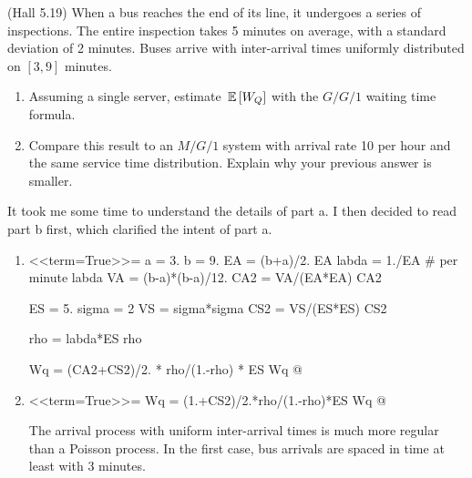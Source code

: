 \begin{question}
  (Hall 5.19) When a bus reaches the end of its line, it undergoes a
  series of inspections. The entire inspection takes 5 minutes on
  average, with a standard deviation of 2 minutes. Buses arrive with
  inter-arrival times uniformly distributed on $[3,9]$ minutes.
  \begin{enumerate}
  \item Assuming a single server, estimate $\,\mathbb{E}\left[W_Q\right]$ with the $G/G/1$ waiting time formula.
  \item Compare this result to an $M/G/1$ system with arrival rate 10 per hour and the same service time distribution. Explain why your previous answer is smaller. 
  \end{enumerate}
  \begin{solution}
      It took me some time to understand the details of part a. I then
decided to read part b first, which clarified the intent of part a.
\begin{enumerate}
\item 
<<term=True>>=
a = 3.
b = 9. 
EA = (b+a)/2.
EA
labda = 1./EA # per minute
labda
VA = (b-a)*(b-a)/12.
CA2 = VA/(EA*EA)
CA2

ES = 5.
sigma = 2
VS = sigma*sigma
CS2 = VS/(ES*ES)
CS2

rho = labda*ES
rho

Wq = (CA2+CS2)/2. * rho/(1.-rho) * ES
Wq
@

\item 
<<term=True>>=
Wq = (1.+CS2)/2.*rho/(1.-rho)*ES
Wq
@

The arrival process with uniform inter-arrival times is much more
regular than a Poisson process. In the first case, bus arrivals are
spaced in time at least with 3 minutes.
  \end{enumerate}
    \end{solution}
\end{question}



